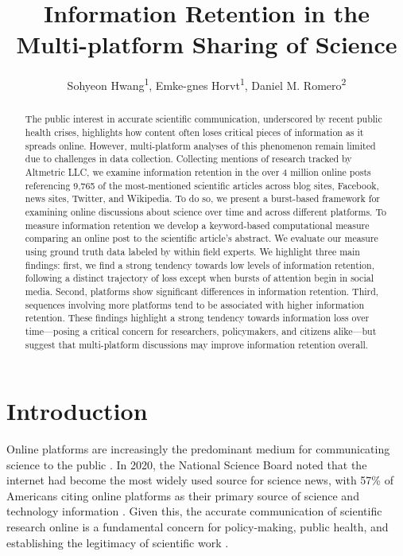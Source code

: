 \documentclass[letterpaper]{article} %
\title{Information Retention in the Multi-platform Sharing of Science}
\author {
    Sohyeon Hwang\textsuperscript{\rm 1},
    Emke-gnes Horvt\textsuperscript{\rm 1},
    Daniel M. Romero\textsuperscript{\rm 2} \\
}
\begin{document}
\maketitle

\begin{abstract}
The public interest in accurate scientific communication, underscored by recent public health crises, highlights how content often loses critical pieces of information as it spreads online. However, multi-platform analyses of this phenomenon remain limited due to challenges in data collection. Collecting mentions of research tracked by Altmetric LLC, we examine information retention in the over 4 million online posts referencing 9,765 of the most-mentioned scientific articles across blog sites, Facebook, news sites, Twitter, and Wikipedia. To do so, we present a burst-based framework for examining online discussions about science over time and across different platforms. To measure information retention we develop a keyword-based computational measure comparing an online post to the scientific article's abstract. We evaluate our measure using ground truth data labeled by within field experts. We highlight three main findings: first, we find a strong tendency towards low levels of information retention, following a distinct trajectory of loss except when bursts of attention begin in social media. Second, platforms show significant differences in information retention. Third, sequences involving more platforms tend to be associated with higher information retention. These findings highlight a strong tendency towards information loss over time---posing a critical concern for researchers, policymakers, and citizens alike---but suggest that multi-platform discussions may improve information retention overall.
\end{abstract}

\section{Introduction}
Online platforms are increasingly the predominant medium for communicating science to the public \citep{suScienceNewsConsumption2015}. In 2020, the National Science Board noted that the internet had become the most widely used source for science news, with 57\% of Americans citing online platforms as their primary source of science and technology information %
\citep{nationalscienceboardScienceTechnologyPublic2020}. Given this, the accurate communication of scientific research online is a fundamental concern for policy-making, public health, and establishing the legitimacy of scientific work \cite{jamiesonSignalingTrustworthinessScience2019}.
\end{document}
